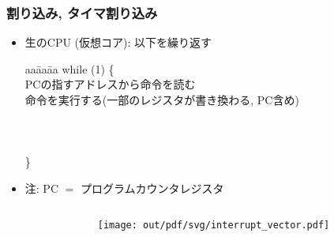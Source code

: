 \documentclass[12pt,dvipdfmx]{beamer}
\begin{document}
\begin{frame}[fragile]
  \frametitle{割り込み, タイマ割り込み}
  \begin{itemize}
  \item [] 生のCPU (仮想コア): 以下を繰り返す
{\small    
\begin{tabbing}
aa\=aa\=aa\kill                                        
while (1) \{                                           \\
\> PCの指すアドレスから命令を読む                      \\
\> 命令を実行する(一部のレジスタが書き換わる, PC含め)  \\
\>                               \\
\>\>                \\
\>                                                   \\
\}                                                     \\
\end{tabbing}}
\item[] 注: PC $=$ プログラムカウンタレジスタ
\end{itemize}

\begin{columns}
  \begin{column}{0.8\textwidth}
    \begin{center}
    \end{center}
  \end{column}
  \begin{column}{0.2\textwidth}
    \texttt{[image: out/pdf/svg/interrupt\_vector.pdf]}
  \end{column}
\end{columns}

\end{frame}
\end{document}
